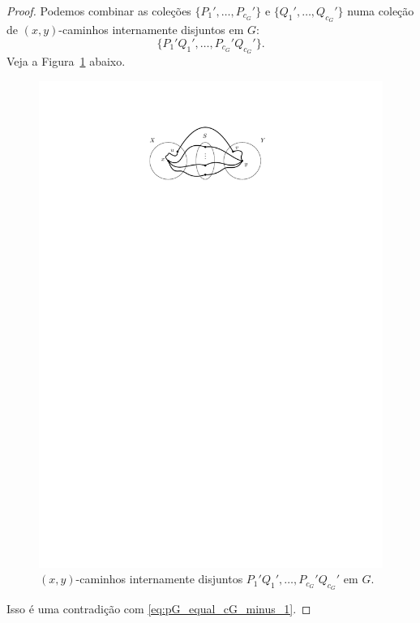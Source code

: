 \documentclass[12pt, a4paper]{article}
\theoremstyle{definition}
\begin{document}
\begin{proof}
Podemos combinar as coleções $\{P_1', \dots, P_{c_G}'\}$ e $\{Q_1', \dots, Q_{c_G}'\}$ numa coleção de $(x,y)$-caminhos internamente disjuntos em $G$:
\[\{P_1'Q_1', \dots, P_{c_G}'Q_{c_G}'\}.\]
Veja a Figura~\ref{fig:connector_in_G} abaixo.
\begin{figure}[H]
  \centering
  \includegraphics{connector_in_G.pdf}
  \caption{$(x,y)$-caminhos internamente disjuntos $P_1'Q_1', \dots, P_{c_G}'Q_{c_G}'$ em $G$.}
  \label{fig:connector_in_G}
\end{figure}
 Isso é uma contradição com \eqref{eq:pG_equal_cG_minus_1}.
\end{proof}

\end{document}
